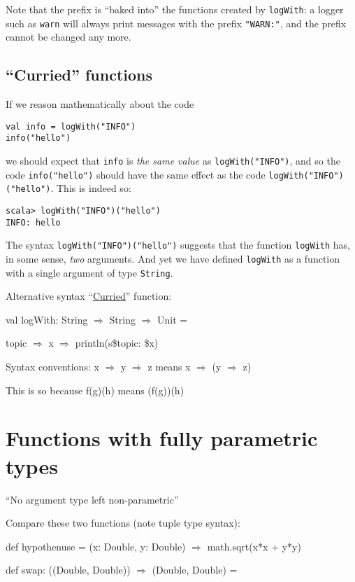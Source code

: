 Note that the prefix is ``baked into'' the functions created by
\lstinline!logWith!: a logger such as \lstinline!warn! will always
print messages with the prefix \lstinline!"WARN:"!, and the prefix
cannot be changed any more.

\subsection{``Curried'' functions}

If we reason mathematically about the code
\begin{lstlisting}
val info = logWith("INFO")
info("hello")
\end{lstlisting}
we should expect that \lstinline!info! is \emph{the same value} as
\lstinline!logWith("INFO")!, and so the code \lstinline!info("hello")!
should have the same effect as the code \lstinline!logWith("INFO")("hello")!.
This is indeed so:
\begin{lstlisting}
scala> logWith("INFO")("hello")
INFO: hello
\end{lstlisting}
The syntax \lstinline!logWith("INFO")("hello")! suggests that the
function \lstinline!logWith! has, in some sense, \emph{two} arguments.
And yet we have defined \lstinline!logWith! as a function with a
single argument of type \lstinline!String!.

Alternative syntax \textendash{} ``\href{https://en.wikipedia.org/wiki/Currying}{Curried}''
function:

val logWith: String $\Rightarrow$ String $\Rightarrow$ Unit = 

  topic $\Rightarrow$ x $\Rightarrow$ println(s\textquotedbl\$topic:
\$x\textquotedbl )

Syntax conventions: x $\Rightarrow$ y $\Rightarrow$ z means x $\Rightarrow$
(y $\Rightarrow$ z)

This is so because f(g)(h) means (f(g))(h) 

\section{Functions with fully parametric types}

``No argument type left non-parametric''

Compare these two functions (note tuple type syntax):

def hypothenuse = (x: Double, y: Double) $\Rightarrow$ math.sqrt(x{*}x
+ y{*}y)

def swap: ((Double, Double)) $\Rightarrow$ (Double, Double) =

